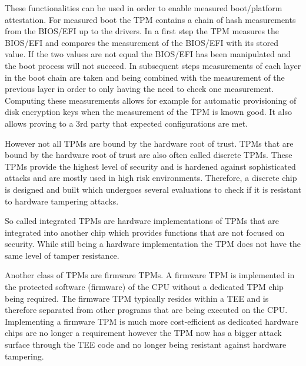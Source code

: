 \documentclass[sigplan,screen,nonacm]{acmart}
\begin{document}
These functionalities can be used in order to enable measured boot/platform attestation.
For measured boot the TPM contains a chain of hash measurements from the BIOS/EFI up to the drivers.
In a first step the TPM measures the BIOS/EFI and compares the measurement of the BIOS/EFI with its stored value.
If the two values are not equal the BIOS/EFI has been manipulated and the boot process will not succeed.
In subsequent steps measurements of each layer in the boot chain are taken and being combined with the measurement of the previous layer in order to only having the need to check one measurement.
Computing these measurements allows for example for automatic provisioning of disk encryption keys when the measurement of the TPM is known good.
It also allows proving to a 3rd party that expected configurations are met.

However not all TPMs are bound by the hardware root of trust.
TPMs that are bound by the hardware root of trust are also often called discrete TPMs.
These TPMs provide the highest level of security and is hardened against sophisticated attacks and are mostly used in high risk environments.
Therefore, a discrete chip is designed and built which undergoes several evaluations to check if it is resistant to hardware tampering attacks\cite{TPM-short}.

So called integrated TPMs are hardware implementations of TPMs that are integrated into another chip which provides functions that are not focused on security.
While still being a hardware implementation the TPM does not have the same level of tamper resistance\cite{TPM-short}.

Another class of TPMs are firmware TPMs.
A firmware TPM is implemented in the protected software (firmware) of the CPU without a dedicated TPM chip being required.
The firmware TPM typically resides within a TEE and is therefore separated from other programs that are being executed on the CPU.
Implementing a firmware TPM is much more cost-efficient as dedicated hardware chips are no longer a requirement however the TPM now has a bigger attack surface through the TEE code and no longer being resistant against hardware tampering\cite{TPM-short}.
\end{document}
